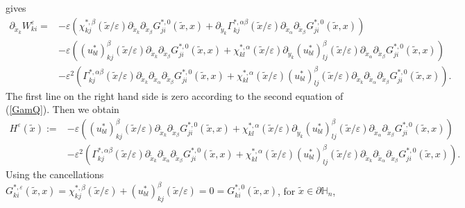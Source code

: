 \documentclass[11pt, reqno]{amsart}
\theoremstyle{definition}
\theoremstyle{remark}
\numberwithin{equation}{section}
\begin{document}
	gives
	\begin{align*}
		\partial_{\tilde{x}_k} W_{ki}^{\varepsilon}
		=& - \varepsilon\left(	\chi^{*,\beta}_{kj}(\tilde{x}/\varepsilon)\partial_{\tilde{x}_k} \partial_{\tilde{x}_{\beta}} G_{ji}^{*,0}  (\tilde{x},x) +\partial_{\tilde{y}_k}\Gamma^{*,\alpha\beta}_{kj}(\tilde{x}/\varepsilon) \partial_{ \tilde{x}_{\alpha}}\partial_{\tilde{x}_{\beta}} G_{ji}^{*,0}  (\tilde{x},x)\right) \\
		&-\varepsilon \left(	(u^*_{bl})^{\beta}_{kj}(\tilde{x}/\varepsilon)\partial_{\tilde{x}_k}\partial_{\tilde{x}_{\beta}} G_{ji}^{*,0}  (\tilde{x},x)+  \chi^{*,\alpha}_{kl}(\tilde{x}/\varepsilon)\partial_{\tilde{y}_k}(u^*_{bl})^{\beta}_{lj}	(\tilde{x}/\varepsilon) \partial_{ \tilde{x}_{\alpha}}\partial_{\tilde{x}_{\beta}}G_{ji}^{*,0}  (\tilde{x},x) \right)  \\
		& - \varepsilon^2 \left(  \Gamma^{*,\alpha\beta}_{kj}(\tilde{x}/\varepsilon)\partial_{\tilde{x}_k}\partial_{ \tilde{x}_{\alpha}}\partial_{\tilde{x}_{\beta}} G_{ji}^{*,0}  (\tilde{x},x) + 	\chi^{*,\alpha}_{kl}(\tilde{x}/\varepsilon)(u^*_{bl})^{\beta}_{lj}	(\tilde{x}/\varepsilon)\partial_{\tilde{x}_k} \partial_{ \tilde{x}_{\alpha}}\partial_{\tilde{x}_{\beta}}G_{ji}^{*,0}  (\tilde{x},x) \right).
	\end{align*}
	The first line on the right hand side is zero according to the second equation of  (\ref{GamQ}). Then we obtain
	\begin{align}
		H^{\varepsilon}(\tilde{x}):=	&-\varepsilon \left(	(u^*_{bl})^{\beta}_{kj}(\tilde{x}/\varepsilon)\partial_{\tilde{x}_k}\partial_{\tilde{x}_{\beta}} G_{ji}^{*,0}  (\tilde{x},x)+  \chi^{*,\alpha}_{kl}(\tilde{x}/\varepsilon)\partial_{\tilde{y}_k}(u^*_{bl})^{\beta}_{lj}	(\tilde{x}/\varepsilon) \partial_{ \tilde{x}_{\alpha}}\partial_{\tilde{x}_{\beta}}G_{ji}^{*,0}  (\tilde{x},x) \right)\nonumber  \\
		& - \varepsilon^2 \left(  \Gamma^{*,\alpha\beta}_{kj}(\tilde{x}/\varepsilon)\partial_{\tilde{x}_k}\partial_{ \tilde{x}_{\alpha}}\partial_{\tilde{x}_{\beta}} G_{ji}^{*,0}  (\tilde{x},x) + 	\chi^{*,\alpha}_{kl}(\tilde{x}/\varepsilon)(u^*_{bl})^{\beta}_{lj}	(\tilde{x}/\varepsilon)\partial_{\tilde{x}_k}\partial_{ \tilde{x}_{\alpha}}\partial_{\tilde{x}_{\beta}} G_{ji}^{*,0}  (\tilde{x},x) \right). \label{h_divW}
	\end{align}
Using the cancellations \; $ G_{ki}^{*,\varepsilon} (\tilde{x},x)=	\chi^{*,\beta}_{kj}(\tilde{x}/\varepsilon) +(u^*_{bl})^{\beta}_{kj}(\tilde{x}/\varepsilon)=0 =  G_{ki}^{*,0} (\tilde{x},x)$,\; for $\tilde{x}\in \partial\mathbb{H}_n$,\;
\end{document}
